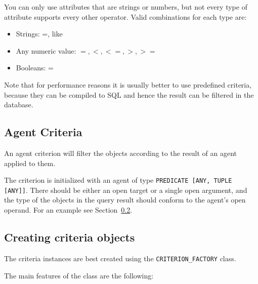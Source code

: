 \documentclass[a4paper,12pt]{report}
\begin{document}
You can only use attributes that are strings or numbers, but not every type of attribute supports every other operator. Valid combinations for each type are:

 \begin{itemize}
  \item Strings: =, like
  \item Any numeric value: $=, <, <=, >, >=$
  \item Booleans: =
 \end{itemize}

Note that for performance reasons it is usually better to use predefined criteria, because they can be compiled to SQL and hence the result can be filtered in the database.

\subsection{Agent Criteria}

An agent criterion will filter the objects according to the result of an agent applied to them.

The criterion is initialized with an agent of type \lstinline!PREDICATE [ANY, TUPLE [ANY]]!. 
There should be either an open target or a single open argument, and the type of the objects in the query result should conform to the agent's open operand. For an example see Section~\ref{sec:creating_criteria_objects}.

\subsection{Creating criteria objects}
\label{sec:creating_criteria_objects}
The criteria instances are best created using the \lstinline!CRITERION_FACTORY! class.

The main features of the class are the following: 
\end{document}
